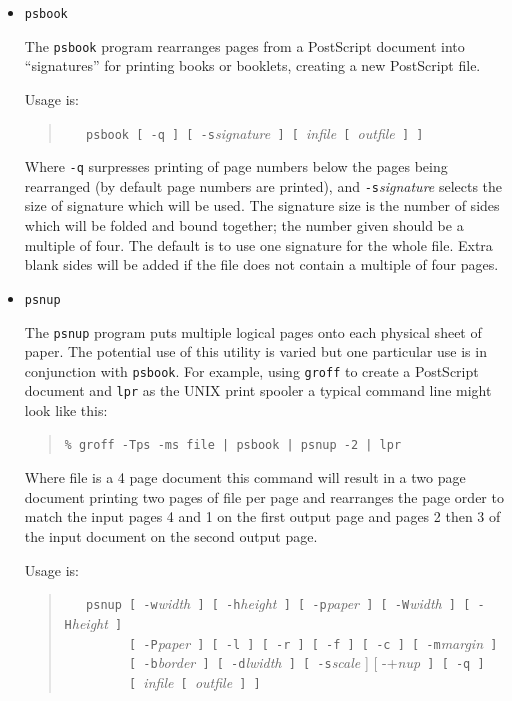 \documentclass[twoside,11pt]{article}
\begin{document}
\begin{itemize}

\item {\tt psbook}

The {\tt psbook} program rearranges pages from a PostScript document into ``signatures'' for printing books or booklets, creating a new PostScript file. 

Usage is: 

\begin{quote}
\verb+   psbook [ -q ] [ -s+{\em signature}\verb+ ] [ +{\em infile}\verb+ [ +{\em outfile}\verb+ ] ]+ 
\end{quote}

Where {\tt -q} surpresses printing of page numbers below the pages being rearranged (by default page numbers are printed), and {\tt -s}{\em signature} selects the size of signature which will be used. The signature size is the number of sides which will be folded and bound together; the number given should be a multiple of four. The default is to use one signature for the whole file. Extra blank sides will be added if the file does not contain a multiple of four pages.    

\item {\tt psnup}

The {\tt psnup} program puts multiple logical pages onto each physical sheet of paper. The potential use of this utility is varied but one particular use is in conjunction with {\tt psbook}. For example, using {\tt groff} to create a PostScript document and {\tt lpr} as the UNIX print spooler a typical command line might look like this: 

\small
\begin{quote}
\begin{verbatim}
% groff -Tps -ms file | psbook | psnup -2 | lpr
\end{verbatim}
\end{quote}
\normalsize

Where file is a 4 page document this command will result in a two page document printing two pages of file per page and rearranges the page order to match the input pages 4 and 1 on the first output page and pages 2 then 3 of the input document on the second output page. 

Usage is:

\begin{quote}
\verb+   psnup [ -w+{\em width}\verb+ ] [ -h+{\em height}\verb+ ] [ -p+{\em paper}\verb+ ] [ -W+{\em width}\verb+ ] [ -H+{\em height}\verb+ ]+\\
\verb+         [ -P+{\em paper}\verb+ ] [ -l ] [ -r ] [ -f ] [ -c ] [ -m+{\em margin}\verb+ ]+\\
\verb+         [ -b+{\em border}\verb+ ] [ -d+{\em lwidth}\verb+ ] [ -s+{\em scale} ] [ -+{\em nup}\verb+ ] [ -q ]+\\
\verb+         [ +{\em infile}\verb+ [ +{\em outfile}\verb+ ] ]+ 
\end{quote}


\end{itemize}
\end{document}
